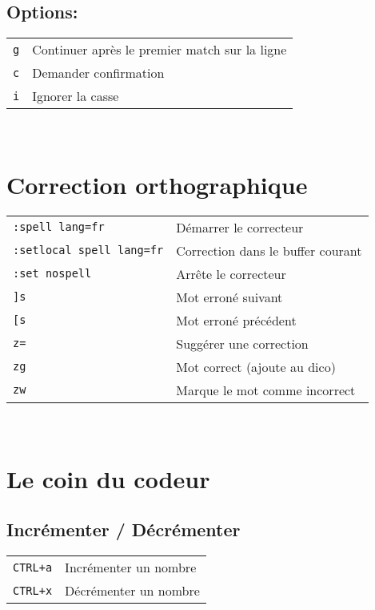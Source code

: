 \documentclass[8pt,landscape,a4paper]{article}
\begin{document}
\begin{multicols*}{3}
    \subsection{Options:}
    \begin{tabular}{m{2cm} l}
        \texttt{g} & Continuer après le premier match sur la ligne\\
        \texttt{c} & Demander confirmation\\
        \texttt{i} & Ignorer la casse\\
    \end{tabular}\\

    \section{Correction orthographique}
    \begin{tabular}{m{4cm} l}
        \texttt{:spell lang=fr} & Démarrer le correcteur\\
        \texttt{:setlocal spell lang=fr} & Correction dans le buffer courant\\
        \texttt{:set nospell} & Arrête le correcteur\\
        \texttt{]s} & Mot erroné suivant\\
        \texttt{[s} & Mot erroné précédent\\
        \texttt{z=} & Suggérer une correction\\
        \texttt{zg} & Mot correct (ajoute au dico)\\
        \texttt{zw} & Marque le mot comme incorrect\\
    \end{tabular}\\

    \section{Le coin du codeur}
    \subsection{Incrémenter / Décrémenter}
    \begin{tabular}{m{2cm} l}
        \texttt{CTRL+a} & Incrémenter un nombre\\
        \texttt{CTRL+x} & Décrémenter un nombre\\
    \end{tabular}\\

\end{multicols*}
\end{document}
